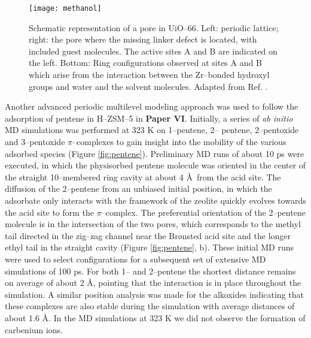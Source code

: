 \begin{figure}[!h]
	\centering
	\texttt{[image: methanol]}
	\caption[Schematic representation of a pore in UiO--66. Left: periodic
	lattice; right: the pore where the missing linker defect is located, with
	included guest molecules. The active sites A and B are indicated
	on the left. Bottom: Ring configurations observed at sites A and B which arise
	from the interaction between the Zr--bonded hydroxyl groups and water and the solvent
molecules.]{Schematic representation of
a pore in UiO--66. Left: periodic lattice; right: the pore where the missing linker defect is located, with
	included guest molecules. The active sites A and B are indicated
	on the left. Bottom: Ring configurations observed at sites A and B which arise
	from the interaction between the Zr--bonded hydroxyl groups and water and the solvent
molecules. Adapted from Ref. \cite{Caratelli2017a}.}
	\label{fig:methanol}
\end{figure}
\npar
\clearpage
Another advanced periodic multilevel modeling approach was used to follow the
adsorption of pentene in H--ZSM--5 in \textbf{Paper VI}. Initially, a series of
\textit{ab initio} MD simulations was performed at 323 K on 1--pentene, 2--
pentene, 2--pentoxide and 3--pentoxide $\pi$--complexes to gain insight into the
mobility of the various adsorbed species (Figure
\ref{fig:pentene}). Preliminary MD runs of about 10 ps
were executed, in which the physisorbed pentene molecule was oriented in the
center of the straight 10--membered ring cavity at about 4 \AA\ from the acid
site. The diffusion of the 2--pentene from an unbiased initial position, in
which the adsorbate only interacts with the framework of the zeolite quickly
evolves towards the acid site to form the $\pi$--complex. The preferential
orientation of the 2--pentene molecule is in the intersection of the two pores,
which corresponds to the methyl tail directed in the zig--zag channel near the
Br\o{}nsted acid site and the longer ethyl tail in the straight cavity (Figure
\ref{fig:pentene}, b).
These initial MD runs were used to select configurations for a subsequent set of extensive MD simulations of 100 ps. For both 1-- and 2--pentene the shortest  distance remains on average
of about 2 \AA, pointing that the  interaction is in place
throughout the simulation. A similar position analysis was made for the alkoxides
indicating that these complexes are also stable during the simulation with
average  distances of about 1.6 \AA. In the MD simulations at 323 K we
did not observe the formation of carbenium ions.
 

